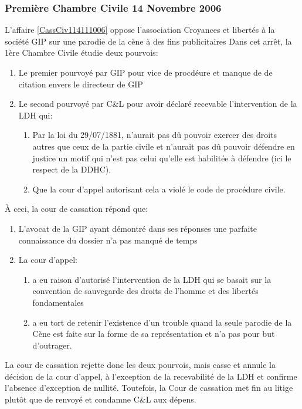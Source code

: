 \documentclass[math]{cours}
\begin{document}
\subsubsection{Première Chambre Civile 14 Novembre 2006}
L'affaire \ref{CassCiv114111006} oppose l'association Croyances et libertés à la société GIP sur une parodie de la cène à des fins publicitaires
Dans cet arrêt, la 1ère Chambre Civile étudie deux pourvois:
\begin{enumerate}
	\item Le premier pourvoyé par GIP pour vice de procdéure et manque de de citation envers le directeur de GIP
	\item Le second pourvoyé par C\&L pour avoir déclaré recevable l'intervention de la LDH qui:
	      \begin{enumerate}
		      \item Par la loi du 29/07/1881, n'aurait pas dû pouvoir exercer des droits autres que ceux de la partie civile et n'aurait pas dû pouvoir défendre en justice un motif qui n'est pas celui qu'elle est habilitée à défendre (ici le respect de la DDHC).
		      \item Que la cour d'appel autorisant cela a violé le code de procédure civile.
	      \end{enumerate}
\end{enumerate}
À ceci, la cour de cassation répond que:
\begin{enumerate}
	\item L'avocat de la GIP ayant démontré dans ses réponses une parfaite connaissance du dossier n'a pas manqué de temps
	\item La cour d'appel:
	      \begin{enumerate}
		      \item a eu raison d'autorisé l'intervention de la LDH qui se basait sur la convention de sauvegarde des droits de l'homme et des libertés fondamentales
		      \item a eu tort de retenir l'existence d'un trouble quand la seule parodie de la Cène est faite sur la forme de sa représentation et n'a pas pour but d'outrager.
	      \end{enumerate}
\end{enumerate}
La cour de cassation rejette donc les deux pourvois, mais casse et annule la décision de la cour d'appel, à l'exception de la recevabilité de la LDH et confirme l'absence d'exception de nullité.
Toutefois, la Cour de cassation met fin au litige plutôt que de renvoyé et condamne C\&L aux dépens.
\end{document}
